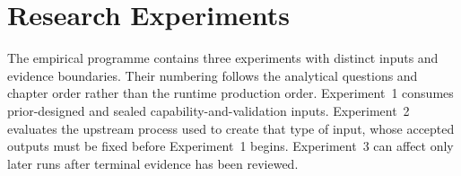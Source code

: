 \section[Research Experiments]{Research Experiments}
\label{sec:research-experiments}
\label{sec:research-programme}

The empirical programme contains three experiments with distinct inputs and
evidence boundaries. Their numbering follows the analytical questions and
chapter order rather than the runtime production order. Experiment~1 consumes
prior-designed and sealed capability-and-validation inputs. Experiment~2
evaluates the upstream process used to create that type of input, whose
accepted outputs must be fixed before Experiment~1 begins. Experiment~3 can
affect only later runs after terminal evidence has been reviewed.

